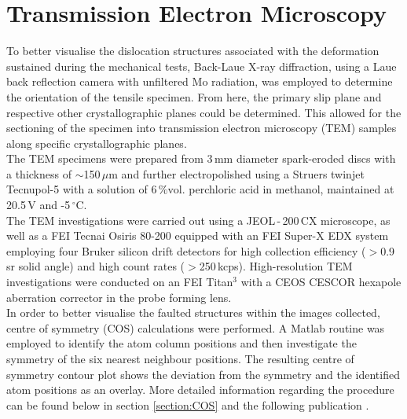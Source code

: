 \documentclass[a4paper,12pt,times,numbered,print,index]{Classes/PhDThesisPSnPDF}
\begin{document}
\section*{Transmission Electron Microscopy}
To better visualise the dislocation structures associated with the deformation sustained during the mechanical tests, Back-Laue X-ray diffraction, using a Laue back reflection camera with unfiltered Mo radiation, was employed to determine the orientation of the tensile specimen. From here, the primary slip plane and respective other crystallographic planes could be determined. This allowed for the sectioning of the specimen into transmission electron microscopy (TEM) samples along specific crystallographic planes.\\
The TEM specimens were prepared from 3\,mm diameter spark-eroded discs with a thickness of $\sim$150\,$\mu\textrm{m}$ and further electropolished using a Struers twinjet Tecnupol-5 with a solution of 6\,$\%\textrm{vol}$. perchloric acid in methanol, maintained at 20.5\,V and -5\,$^\circ$C.\\
The TEM investigations were carried out using a JEOL\,-\,200\,CX microscope, as well as a FEI Tecnai Osiris 80-200 equipped with an FEI Super-X EDX system employing four Bruker silicon drift detectors for high collection efficiency ($>$0.9\,sr solid angle) and high count rates ($>$250\,kcps). High-resolution TEM investigations were conducted on an FEI Titan$^3$ with a CEOS CESCOR hexapole aberration corrector in the probe forming lens.\\
In order to better visualise the faulted structures within the images collected, centre of symmetry (COS) calculations were performed. A Matlab routine was employed to identify the atom column positions and then investigate the symmetry of the six nearest neighbour positions. The resulting centre of symmetry contour plot shows the deviation from the symmetry and the identified atom positions as an overlay. More detailed information regarding the procedure can be found below in section \ref{section:COS} and the following publication \cite{messe2014precipitation}.
\end{document}
